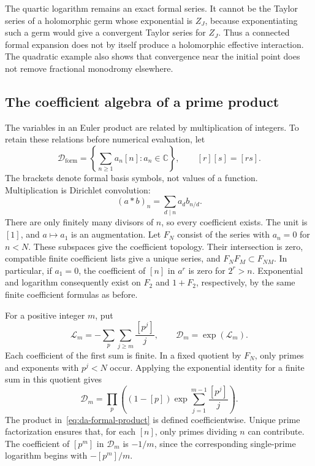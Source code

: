 The quartic logarithm remains an exact formal series. It cannot be
the Taylor series of a holomorphic germ whose exponential is $Z_J$,
because exponentiating such a germ would give a convergent Taylor
series for $Z_J$. Thus a connected formal expansion does not by itself
produce a holomorphic effective interaction. The quadratic example
also shows that convergence near the initial point does not remove
fractional monodromy elsewhere.

\subsection{The coefficient algebra of a prime product}
\label{sec:da-dirichlet}

The variables in an Euler product are related by multiplication of
integers. To retain these relations before numerical evaluation, let
\[
 \mathscr D_{\mathrm{form}}=
 \left\{\sum_{n\geq1}a_n[n]:a_n\in\mathbb C\right\},
 \qquad [r][s]=[rs].
\]
The brackets denote formal basis symbols, not values of a function.
Multiplication is Dirichlet convolution:
\[
 (a*b)_n=\sum_{d\mid n}a_d b_{n/d}.
\]
There are only finitely many divisors of $n$, so every coefficient
exists. The unit is $[1]$, and $a\mapsto a_1$ is an augmentation.
Let $F_N$ consist of the series with $a_n=0$ for $n<N$.
These subspaces give the coefficient topology. Their intersection
is zero, compatible finite coefficient lists give a unique series,
and $F_NF_M\subset F_{NM}$.
In particular, if $a_1=0$, the coefficient of $[n]$ in $a^r$ is
zero for $2^r>n$. Exponential and logarithm consequently exist on
$F_2$ and $1+F_2$, respectively, by the same finite coefficient
formulas as before.

For a positive integer $m$, put
\[
 \mathscr L_m=-\sum_p\sum_{j\geq m}\frac{[p^j]}j,
 \qquad \mathscr D_m=\exp(\mathscr L_m).
\]
Each coefficient of the first sum is finite. In a fixed quotient
by $F_N$, only primes and exponents with $p^j<N$ occur. Applying
the exponential identity for a finite sum in this quotient gives
\begin{equation}
 \mathscr D_m=\prod_p
 \left((1-[p])\exp\!\sum_{j=1}^{m-1}\frac{[p^j]}j\right).
 \label{eq:da-formal-product}
\end{equation}
The product in~\eqref{eq:da-formal-product} is defined coefficientwise. Unique prime
factorization ensures that, for each $[n]$, only primes dividing
$n$ can contribute. The coefficient of $[p^m]$ in $\mathscr D_m$
is $-1/m$, since the corresponding single-prime logarithm begins
with $-[p^m]/m$.

